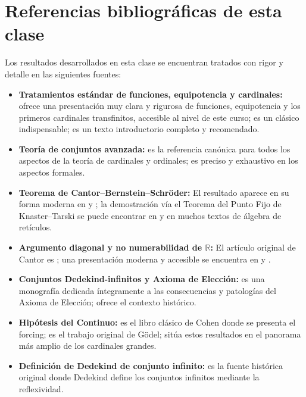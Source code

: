 \section*{Referencias bibliográficas de esta clase}

Los resultados desarrollados en esta clase se encuentran tratados con rigor y detalle en las siguientes fuentes:

\begin{itemize}[leftmargin=2em]
  \item \textbf{Tratamientos estándar de funciones, equipotencia y cardinales:} \cite{enderton1977} ofrece una presentación muy clara y rigurosa de funciones, equipotencia y los primeros cardinales transfinitos, accesible al nivel de este curso; \cite{halmos1960} es un clásico indispensable; \cite{hrbacek1999} es un texto introductorio completo y recomendado.

  \item \textbf{Teoría de conjuntos avanzada:} \cite{jech2003} es la referencia canónica para todos los aspectos de la teoría de cardinales y ordinales; \cite{kunen2011} es preciso y exhaustivo en los aspectos formales.

  \item \textbf{Teorema de Cantor–Bernstein–Schröder:} El resultado aparece en su forma moderna en \cite{enderton1977} y \cite{jech2003}; la demostración vía el Teorema del Punto Fijo de Knaster–Tarski se puede encontrar en \cite{devlin1993} y en muchos textos de álgebra de retículos.

  \item \textbf{Argumento diagonal y no numerabilidad de $\mathbb{R}$:} El artículo original de Cantor es \cite{cantor1891}; una presentación moderna y accesible se encuentra en \cite{enderton1977} y \cite{sierpinski1958}.

  \item \textbf{Conjuntos Dedekind-infinitos y Axioma de Elección:} \cite{herrlich2006} es una monografía dedicada íntegramente a las consecuencias y patologías del Axioma de Elección; \cite{moore1982} ofrece el contexto histórico.

  \item \textbf{Hipótesis del Continuo:} \cite{cohen1966} es el libro clásico de Cohen donde se presenta el forcing; \cite{godel1940} es el trabajo original de Gödel; \cite{kanamori2003} sitúa estos resultados en el panorama más amplio de los cardinales grandes.

  \item \textbf{Definición de Dedekind de conjunto infinito:} \cite{dedekind1888} es la fuente histórica original donde Dedekind define los conjuntos infinitos mediante la reflexividad.
\end{itemize}

